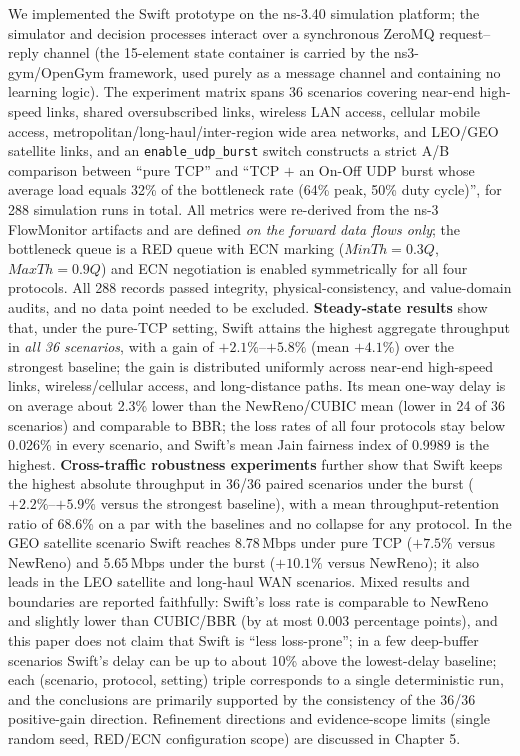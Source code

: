 \begin{englishabstract}
We implemented the Swift prototype on the ns-3.40 simulation platform; the simulator and decision processes interact over a synchronous ZeroMQ request--reply channel (the 15-element state container is carried by the ns3-gym/OpenGym framework, used purely as a message channel and containing no learning logic). The experiment matrix spans 36 scenarios covering near-end high-speed links, shared oversubscribed links, wireless LAN access, cellular mobile access, metropolitan/long-haul/inter-region wide area networks, and LEO/GEO satellite links, and an \texttt{enable\_udp\_burst} switch constructs a strict A/B comparison between ``pure TCP'' and ``TCP $+$ an On-Off UDP burst whose average load equals 32\% of the bottleneck rate (64\% peak, 50\% duty cycle)'', for 288 simulation runs in total. All metrics were re-derived from the ns-3 FlowMonitor artifacts and are defined \emph{on the forward data flows only}; the bottleneck queue is a RED queue with ECN marking ($MinTh=0.3Q$, $MaxTh=0.9Q$) and ECN negotiation is enabled symmetrically for all four protocols. All 288 records passed integrity, physical-consistency, and value-domain audits, and no data point needed to be excluded. \textbf{Steady-state results} show that, under the pure-TCP setting, Swift attains the highest aggregate throughput in \emph{all 36 scenarios}, with a gain of $+2.1\%$--$+5.8\%$ (mean $+4.1\%$) over the strongest baseline; the gain is distributed uniformly across near-end high-speed links, wireless/cellular access, and long-distance paths. Its mean one-way delay is on average about 2.3\% lower than the NewReno/CUBIC mean (lower in 24 of 36 scenarios) and comparable to BBR; the loss rates of all four protocols stay below 0.026\% in every scenario, and Swift's mean Jain fairness index of 0.9989 is the highest. \textbf{Cross-traffic robustness experiments} further show that Swift keeps the highest absolute throughput in 36/36 paired scenarios under the burst ($+2.2\%$--$+5.9\%$ versus the strongest baseline), with a mean throughput-retention ratio of 68.6\% on a par with the baselines and no collapse for any protocol. In the GEO satellite scenario Swift reaches 8.78\,Mbps under pure TCP ($+7.5\%$ versus NewReno) and 5.65\,Mbps under the burst ($+10.1\%$ versus NewReno); it also leads in the LEO satellite and long-haul WAN scenarios. Mixed results and boundaries are reported faithfully: Swift's loss rate is comparable to NewReno and slightly lower than CUBIC/BBR (by at most 0.003 percentage points), and this paper does not claim that Swift is ``less loss-prone''; in a few deep-buffer scenarios Swift's delay can be up to about 10\% above the lowest-delay baseline; each (scenario, protocol, setting) triple corresponds to a single deterministic run, and the conclusions are primarily supported by the consistency of the 36/36 positive-gain direction. Refinement directions and evidence-scope limits (single random seed, RED/ECN configuration scope) are discussed in Chapter 5.


\end{englishabstract}
